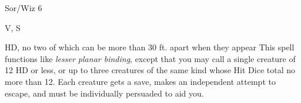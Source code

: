 
\begin{description*}
\item[Level:] Sor/Wiz 6
\item[Components:] V, S
\end{description*}

HD, no two of which can be more than 30 ft. apart when they appear
This spell functions like \textit{lesser planar binding}, except that you may call
a single creature of 12 HD or less, or up to three creatures of the same kind whose
Hit Dice total no more than 12. Each creature gets a save, makes an independent
attempt to escape, and must be individually persuaded to aid you.